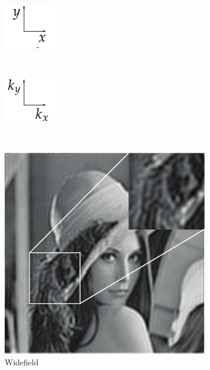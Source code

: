 \begin{figure}[h]
  \centering
  \begin{subfigure}[t]{0.23\textwidth}
      \includegraphics{coordinates_xy}
  \end{subfigure}~
  \begin{subfigure}[t]{0.23\textwidth}
      \includegraphics{coordinates_kxky}
  \end{subfigure}\\
  \begin{subfigure}[t]{0.23\textwidth}
      \centering
      \includegraphics[width=\textwidth]{widefield_slit/widefield}
      \caption{Widefield}
  \end{subfigure}~
  \begin{subfigure}[t]{0.23\textwidth}

\end{subfigure}
\end{figure}
